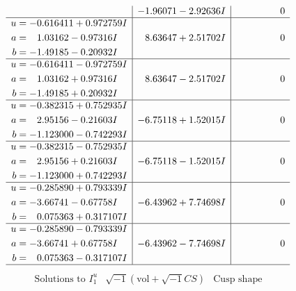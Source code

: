 \documentclass[1p]{elsarticle_modified}
\theoremstyle{definition}
\newcommand{\I}{\sqrt{-1}}
\begin{document}
$$\begin{array}{c|c|c}
 & -1.96071 - 2.92636 I & \phantom{-0.000000 } 0 \\ \hline\begin{aligned}
u &= -0.616411 + 0.972759 I \\
a &= \phantom{-}1.03162 - 0.97316 I \\
b &= -1.49185 - 0.20932 I\end{aligned}
 & \phantom{-}8.63647 + 2.51702 I & \phantom{-0.000000 } 0 \\ \hline\begin{aligned}
u &= -0.616411 - 0.972759 I \\
a &= \phantom{-}1.03162 + 0.97316 I \\
b &= -1.49185 + 0.20932 I\end{aligned}
 & \phantom{-}8.63647 - 2.51702 I & \phantom{-0.000000 } 0 \\ \hline\begin{aligned}
u &= -0.382315 + 0.752935 I \\
a &= \phantom{-}2.95156 - 0.21603 I \\
b &= -1.123000 - 0.742293 I\end{aligned}
 & -6.75118 + 1.52015 I & \phantom{-0.000000 } 0 \\ \hline\begin{aligned}
u &= -0.382315 - 0.752935 I \\
a &= \phantom{-}2.95156 + 0.21603 I \\
b &= -1.123000 + 0.742293 I\end{aligned}
 & -6.75118 - 1.52015 I & \phantom{-0.000000 } 0 \\ \hline\begin{aligned}
u &= -0.285890 + 0.793339 I \\
a &= -3.66741 - 0.67758 I \\
b &= \phantom{-}0.075363 + 0.317107 I\end{aligned}
 & -6.43962 + 7.74698 I & \phantom{-0.000000 } 0 \\ \hline\begin{aligned}
u &= -0.285890 - 0.793339 I \\
a &= -3.66741 + 0.67758 I \\
b &= \phantom{-}0.075363 - 0.317107 I\end{aligned}
 & -6.43962 - 7.74698 I & \phantom{-0.000000 } 0\\
 \hline 
 \end{array}$$\newpage$$\begin{array}{c|c|c}  
\text{Solutions to }I^u_{1}& \I (\text{vol} + \sqrt{-1}CS) & \text{Cusp shape}\\

\end{array}$$
\end{document}
